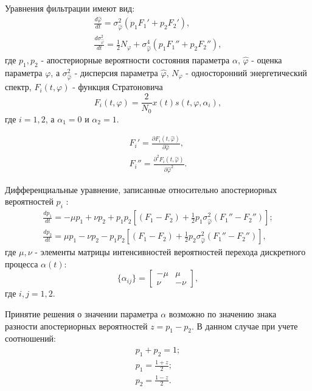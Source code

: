 Уравнения фильтрации имеют вид:
\begin{eqnarray}
	\frac{d \hat{\varphi}}{dt} = \sigma_{\hat{\varphi}}^2(p_1 F_{1}' + p_2 F_{2}'), \nonumber \\
	\frac{d \sigma_{\hat{\varphi}}^2}{dt} = \frac{1}{2}N_{\varphi} + \sigma_{\hat{\varphi}}^4(p_1 F_{1}'' + p_2 F_{2}''),
	\label{eq:sec4_filter_eq}
\end{eqnarray}
где ${p_1, p_2}$ - апостериорные вероятности состояния параметра ${\alpha}$, ${\hat{\varphi}}$ - оценка параметра ${\varphi}$, а ${\sigma_{\hat{\varphi}}^2}$ - 
дисперсия параметра ${\hat{\varphi}}$, ${N_{\varphi}}$ - односторонний энергетический спектр, ${F_i(t, \varphi)}$ - функция Стратоновича
\begin{equation}
	F_i(t, \varphi) = \frac{2}{N_0} x(t)s(t, \varphi, \alpha_i),
	\label{eq:sec4_stratonovicha_eq}
\end{equation}
где ${i = 1, 2}$, а ${\alpha_1 = 0}$ и ${\alpha_2 = 1}$.

\begin{eqnarray}
	F_{i}' = \frac{\partial{F_i (t, \hat{\varphi})}}{\partial{\hat{\varphi}}}, \nonumber \\
	F_{i}'' = \frac{\partial^2{F_i (t, \hat{\varphi})}}{\partial{\hat{\varphi}^2}}.
	\label{eq:sec4_stratonovicha_eq_der}
\end{eqnarray}

Дифференциальные уравнение, записанные относительно  апостериорных вероятностей ${p_i}$ \cite{shahtarin-wiener-kalman}:
\begin{eqnarray}
	\frac{dp_1}{dt} = -\mu p_1 + \nu p_2 + p_1 p_2 \left[ (F_1 - F_2) + \frac{1}{2} p_1 \sigma_{\hat{\varphi}}^2 (F_1'' - F_2'') \right]; \nonumber \\
	\frac{dp_2}{dt} = \mu p_1 - \nu p_2 - p_1 p_2 \left[ (F_1 - F_2) + \frac{1}{2} p_2 \sigma_{\hat{\varphi}}^2 (F_1'' - F_2'') \right],
	\label{eq:sec4_stratonovicha_eq_der_p}
\end{eqnarray}
где ${\mu, \nu}$ - элементы матрицы интенсивностей вероятностей перехода дискретного процесса ${\alpha(t)}$:
\begin{equation}
	\label{eq:sec4_alpha}
	\{\alpha_{ij}\}
	=
		\left[ \begin{array}{cc}
			-\mu	&	\mu \\
			\nu 	&	-\nu
		\end{array} \right],
\end{equation}
где ${i,j = 1,2}$.

Принятие решения о значении параметра ${\alpha}$ возможно по значению знака разности апостериорных вероятностей ${z = p_1 - p_2}$. В данном случае
при учете соотношений:
\begin{eqnarray}
	p_1 + p_2 = 1; \nonumber \\
	p_1 = \frac{1+z}{2}; \nonumber \\
	p_2 = \frac{1-z}{2}.
	\label{eq:sec4_probability}
\end{eqnarray}

